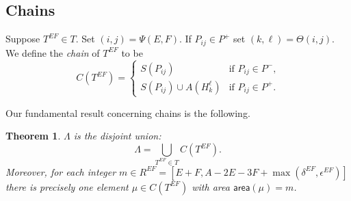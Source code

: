 \documentclass[11pt,reqno]{amsart}
\newcommand{\defn}[1]{{\color{darkred}\emph{#1}}} %
\newtheorem{theorem}{Theorem}[section]
\theoremstyle{definition}
\numberwithin{equation}{section}
\begin{document}
\subsection{Chains}
\label{section.chains}
Suppose $T^{EF} \in T$.  Set $(i,j)=\Psi(E,F)$.  If $P_{ij} \in P^+$ set $(k,\ell)=\Theta(i,j)$.  We define the \defn{chain} of 
$T^{EF}$ to be 
\begin{equation}
	C(T^{EF})=\begin{cases}
	S(P_{ij}) & \text{if $P_{ij} \in P^-$,}\\
	S(P_{ij}) \cup A(H_k^\ell) & \text{if $P_{ij} \in P^+$.}
	\end{cases}
\end{equation} 

Our fundamental result concerning chains is the following.
\begin{theorem}
\label{theorem.chain decomp}
$\Lambda$ is the disjoint union:
\[
	\Lambda= \bigcup_{T^{EF} \in T} C(T^{EF}).
\]
Moreover, for each integer $m \in R^{EF}=[E+F,A-2E-3F+\max(\delta^{EF},\epsilon^{EF})]$ there is precisely one element 
$\mu \in C(T^{EF})$ with area $\mathsf{area}(\mu)=m$.
\end{theorem}
\end{document}
